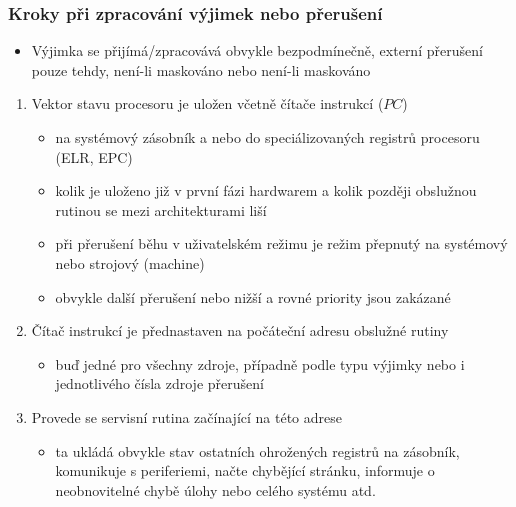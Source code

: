 \documentclass{beamer}
\begin{document}
\begin{frame}
\frametitle{Kroky při zpracování výjimek nebo přerušení}

\begin{itemize}
 \item Výjimka se přijímá/zpracovává obvykle bezpodmínečně,
externí přerušení pouze tehdy, není-li maskováno nebo není-li maskováno
\end{itemize}

\begin{enumerate}
 \item Vektor stavu procesoru je uložen včetně čítače instrukcí ($PC$)
 \begin{itemize}
  \item na systémový zásobník a nebo do speciálizovaných registrů procesoru (ELR, EPC)
  \item kolik je uloženo již v první fázi hardwarem a kolik později obslužnou rutinou se mezi architekturami liší
  \item při přerušení běhu v uživatelském režimu je režim přepnutý na systémový nebo strojový (machine)
  \item obvykle další přerušení nebo nižší a rovné priority jsou zakázané
 \end{itemize}
 \item Čítač instrukcí je přednastaven na počáteční adresu obslužné rutiny
 \begin{itemize}
  \item buď jedné pro všechny zdroje, případně podle typu výjimky nebo i jednotlivého čísla zdroje přerušení
 \end{itemize}
 \item Provede se servisní rutina začínající na této adrese
 \begin{itemize}
  \item ta ukládá obvykle stav ostatních ohrožených registrů na zásobník, komunikuje s periferiemi,
        načte chybějící stránku, informuje o neobnovitelné chybě úlohy nebo celého systému atd.
 \end{itemize}
\end{enumerate}
\end{frame}
\end{document}
